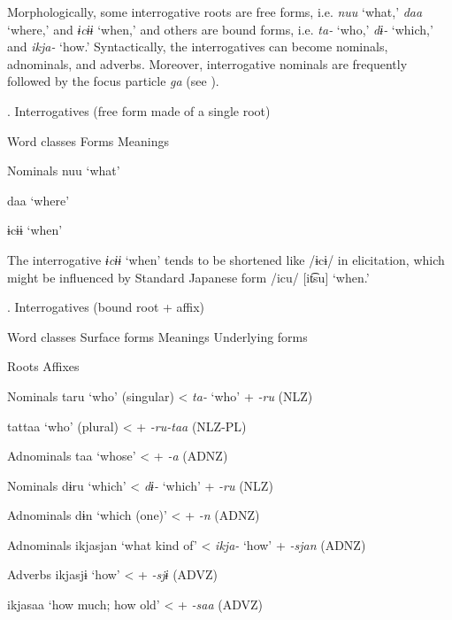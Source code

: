 Morphologically, some interrogative roots are free forms, i.e. \textit{nuu} ‘what,’ \textit{daa} ‘where,’ and \textit{ɨcɨɨ} ‘when,’ and others are bound forms, i.e. \textit{ta-} ‘who,’ \textit{dɨ-} ‘which,’ and \textit{ikja-} ‘how.’ Syntactically, the interrogatives can become nominals, adnominals, and adverbs. Moreover, interrogative nominals are frequently followed by the focus particle \textit{ga} (see ).

\begin{styleBeschriftung}
\textmd{. Interrogatives (free form made of a single root)}
\end{styleBeschriftung}

Word classes    Forms  Meanings

Nominals    nuu  ‘what’

    daa  ‘where’

    ɨcɨɨ  ‘when’

The interrogative \textit{ɨcɨɨ} ‘when’ tends to be shortened like /ɨcɨ/ in elicitation, which might be influenced by Standard Japanese form /icu/ [it͡su] ‘when.’

\begin{styleBeschriftung}
\textmd{. Interrogatives (bound root + affix)}
\end{styleBeschriftung}

Word classes    Surface forms  Meanings      Underlying forms

            Roots    Affixes

Nominals    taru  ‘who’ (singular)    <  \textit{ta-}  ‘who’  +  \textit{{}-ru}  (NLZ)

    tattaa  ‘who’ (plural)    <      +  \textit{{}-ru-taa}  (NLZ-PL)

Adnominals    taa  ‘whose’    <      +  \textit{{}-a} (ADNZ)

Nominals    dɨru  ‘which’    <  \textit{dɨ-}  ‘which’  +  \textit{{}-ru} (NLZ)

Adnominals    dɨn  ‘which (one)’    <      +  \textit{{}-n} (ADNZ)

Adnominals    ikjasjan  ‘what kind of’    <  \textit{ikja-}  ‘how’  +  \textit{{}-sjan} (ADNZ)

Adverbs    ikjasjɨ  ‘how’    <      +  \textit{{}-sjɨ} (ADVZ)

    ikjasaa  ‘how much; how old’    <      +  \textit{{}-saa} (ADVZ)

